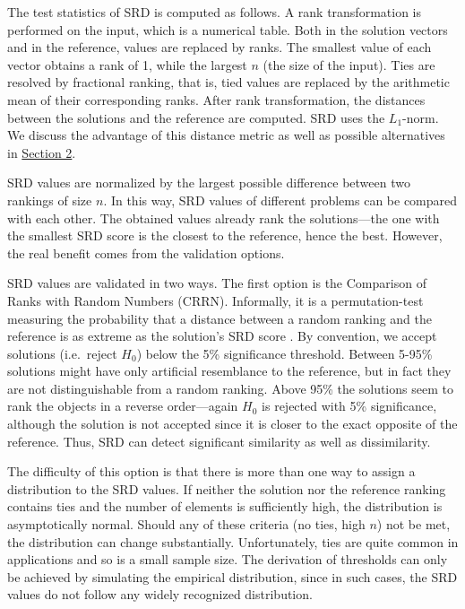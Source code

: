 The test statistics of SRD is computed as follows. A rank transformation is performed on the input, which is a numerical table. Both in the solution vectors and in the reference, values are replaced by ranks. The smallest value of each vector obtains a rank of 1, while the largest $n$ (the size of the input). Ties are resolved by fractional ranking, that is, tied values are replaced by the arithmetic mean of their corresponding ranks. After rank transformation, the distances between the solutions and the reference are computed. SRD uses the $L_1$-norm. We discuss the advantage of this distance metric as well as possible alternatives in  \hyperref[sec:lit_distance]{Section 2}. %

SRD values are normalized by the largest possible difference between two rankings of size $n$. In this way, SRD values of different problems can be compared with each other. The obtained values already rank the solutions---the one with the smallest SRD score is the closest to the reference, hence the best. However, the real benefit comes from the validation options.

SRD values are validated in two ways. The first option is the Comparison of Ranks with Random Numbers (CRRN). Informally, it is a permutation-test measuring the probability that a distance between a random ranking and the reference is as extreme as the solution's SRD score \citep{KOLLARHUNEK2013139}. By convention, we accept solutions (i.e.\ reject $H_0$) below the 5\% significance threshold. Between 5-95\% solutions might have only artificial resemblance to the reference, but in fact they are not distinguishable from a random ranking. Above 95\% the solutions seem to rank the objects in a reverse order---again $H_0$ is rejected with 5\% significance, although the solution is not accepted since it is closer to the exact opposite of the reference. Thus, SRD can detect significant similarity as well as dissimilarity.

The difficulty of this option is that there is more than one way to assign a distribution to the SRD values. If neither the solution nor the reference ranking contains ties and the number of elements is sufficiently high, the distribution is asymptotically normal. Should any of these criteria (no ties, high $n$) not be met, the distribution can change substantially. Unfortunately, ties are quite common in applications and so is a small sample size. The derivation of thresholds can only be achieved by simulating the empirical distribution, since in such cases, the SRD values do not follow any widely recognized distribution.

